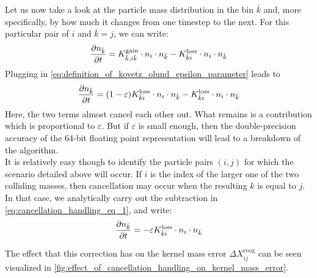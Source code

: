         Let us now take a look at the particle mass distribution in the bin $\bar k$ and, more 
        specifically, by how much it changes from one timestep to the next. For this particular 
        pair of $i$ and $\bar k=j$, we can write:
        \begin{equation}
            \frac{\partial n_{\bar k}}{\partial t}
                =K_{\bar k,i\bar k}^{\text{gain}}\cdot n_i\cdot n_{\bar k}
                -K_{\bar ki}^{\text{loss}}\cdot n_i\cdot n_{\bar k}
        \end{equation}
        Plugging in \cref{eq:definition_of_kovetz_olund_epsilon_parameter} leads to
        \begin{equation}
            \label{eq:cancellation_handling_eq_1}
            \frac{\partial n_{\bar k}}{\partial t}
                =(1-\varepsilon)K_{\bar ki}^{\text{loss}}\cdot n_i\cdot n_{\bar k}
                -K_{\bar ki}^{\text{loss}}\cdot n_i\cdot n_{\bar k}
        \end{equation}
        Here, the two terms almost cancel each other out. What remains is a contribution which is 
        proportional to $\varepsilon$. But if $\varepsilon$ is small enough, then the 
        double-precision accuracy of the 64-bit floating point representation will lead to a
        breakdown of the algorithm. \\
        
        It is relatively easy though to identify the particle pairs $(i,j)$ for which the scenario 
        detailed above will occur. 
        If $i$ is the index of the larger one of the two colliding masses, then cancellation may 
        occur when the resulting $k$ is equal to $j$. \\
        
        In that case, we analytically carry out the subtraction in 
        \cref{eq:cancellation_handling_eq_1}, and write:
        \begin{equation}
            \frac{\partial n_{\bar k}}{\partial t}
                = -\varepsilon K_{\bar ki}^{\text{loss}}\cdot n_i\cdot n_{\bar k}
        \end{equation}


        The effect that this correction has on the kernel mass error $\Delta X_{ij}^\text{coag}$ 
        can be seen visualized in \cref{fig:effect_of_cancellation_handling_on_kernel_mass_error}.

